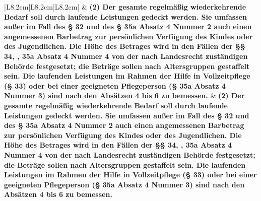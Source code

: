 \documentclass[10pt,a4paper,landscape]{article}
\begin{document}
\begin{longtable}{|L{8.2cm}|L{8.2cm}|L{8.2cm}|}
 & \textbf{(2) Der gesamte regelmäßig  \newline wiederkehrende Bedarf soll durch  \newline laufende Leistungen gedeckt werden.  \newline Sie umfassen außer im Fall des \S{} 32 und  \newline des \S{} 35a Absatz 4 Nummer 2 auch  \newline einen angemessenen Barbetrag zur  \newline persönlichen Verfügung des Kindes  \newline oder des Jugendlichen. Die Höhe des  \newline Betrages wird in den Fällen der \S{}\S{} 34,  , 35a Absatz 4 Nummer 4 von der  \newline nach Landesrecht zuständigen Behörde  \newline festgesetzt; die Beträge sollen nach  \newline Altersgruppen gestaffelt sein. Die  \newline laufenden Leistungen im Rahmen der  \newline Hilfe in Vollzeitpflege (\S{} 33) oder bei  \newline einer geeigneten Pflegeperson (\S{} 35a  \newline Absatz 4 Nummer 3) sind nach den  \newline Absätzen 4 bis 6 zu bemessen. } & \textbf{(2) Der gesamte regelmäßig  \newline wiederkehrende Bedarf soll durch  \newline laufende Leistungen gedeckt werden.  \newline Sie umfassen außer im Fall des \S{} 32 und  \newline des \S{} 35a Absatz 4 Nummer 2 auch  \newline einen angemessenen Barbetrag zur  \newline persönlichen Verfügung des Kindes  \newline oder des Jugendlichen. Die Höhe des  \newline Betrages wird in den Fällen der \S{}\S{} 34,  , 35a Absatz 4 Nummer 4 von der  \newline nach Landesrecht zuständigen Behörde  \newline festgesetzt; die Beträge sollen nach  \newline Altersgruppen gestaffelt sein. Die  \newline laufenden Leistungen im Rahmen der  \newline Hilfe in Vollzeitpflege (\S{} 33) oder bei  \newline einer geeigneten Pflegeperson (\S{} 35a  \newline Absatz 4 Nummer 3) sind nach den  \newline Absätzen 4 bis 6 zu bemessen. } \\

\end{longtable}
\end{document}
